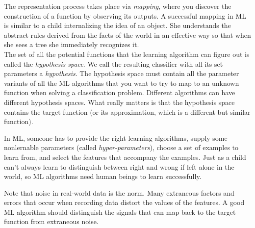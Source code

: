 The representation process takes place via \emph{mapping}, where you discover the construction of a function by observing its outputs. A successful mapping in ML is similar to a child internalizing the idea of an object. She understands the abstract rules derived from the facts of the world in an effective way so that when she sees a tree she immediately recognizes it.\\
The set of all the potential functions that the learning algorithm can figure out is called the \emph{hypothesis space}. We call the resulting classifier with all its set parameters a \emph{hypothesis}. The hypothesis space must contain all the parameter variants of all the ML algorithms that you want to try to map to an unknown function when solving a classification problem. Different algorithms can have different hypothesis spaces. What really matters is that the hypothesis space contains the target function (or its approximation, which is a different but similar function).
\begin{definition}
	In ML, someone has to provide the right learning algorithms, supply some nonlernable parameters (called \emph{hyper-parameters}), choose a set of examples to learn from, and select the features that accompany the examples. Just as a child can't always learn to distinguish between right and wrong if left alone in the world, so ML algorithms need human beings to learn successfully.
\end{definition}
Note that noise in real-world data is the norm. Many extraneous factors and errors that occur when recording data distort the values  of the features. A good ML algorithm should distinguish the signals that can map back to the target function from extraneous noise.
